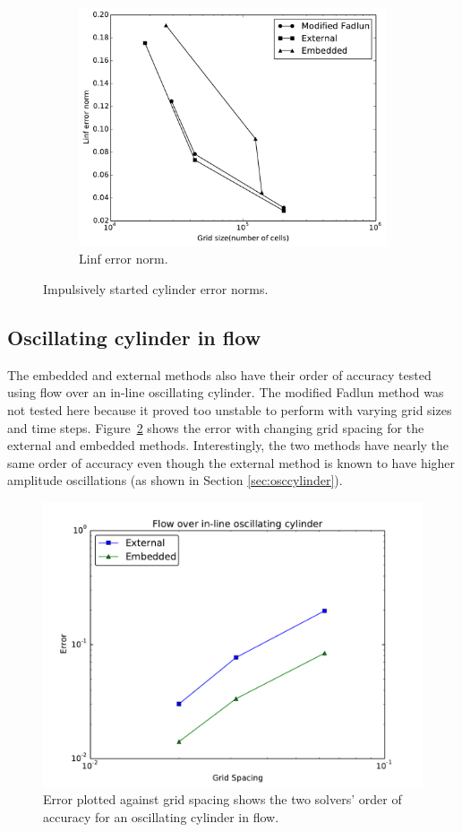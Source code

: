 \begin{figure}[H]
	\begin{subfigure}{0.6\textwidth}
		\includegraphics[width=\linewidth]{Linf_error_norm}
		\caption{Linf error norm.}
	\end{subfigure}
	\caption{Impulsively started cylinder error norms.}
	\label{fig:error norm}
\end{figure}

\subsection{Oscillating cylinder in flow}
The embedded and external methods also have their order of accuracy tested using flow over an in-line oscillating cylinder. 
The modified Fadlun method was not tested here because it proved too unstable to perform with varying grid sizes and time steps. 
Figure~\ref{fig:oscerror} shows the error with changing grid spacing for the external and embedded methods. 
Interestingly, the two methods have nearly the same order of accuracy even though the external method is known to have higher amplitude oscillations (as shown in Section \ref{sec:osccylinder}). 

\begin{figure}[!htb]
	\centering
	\includegraphics[width=0.6\linewidth]{error_oscflow}
	\caption{Error plotted against grid spacing shows the two solvers' order of accuracy for an oscillating cylinder in flow.}
	\label{fig:oscerror}
\end{figure}

